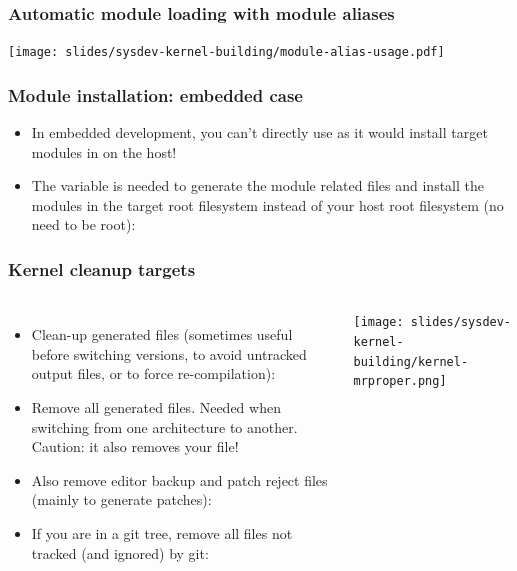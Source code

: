 \begin{frame}
  \frametitle{Automatic module loading with module aliases}
  \texttt{[image: slides/sysdev-kernel-building/module-alias-usage.pdf]}
\end{frame}

\begin{frame}
  \frametitle{Module installation: embedded case}
  \begin{itemize}
  \item In embedded development, you can't directly use
     as it would install target modules
    in  on the host!
  \item The  variable is needed to generate
    the module related files and install the modules in the target
    root filesystem instead of your host root filesystem (no need
    to be root):\\
  \end{itemize}
\end{frame}

\begin{frame}
  \frametitle{Kernel cleanup targets}
  \begin{columns}
    \small
    \begin{itemize}
    \item Clean-up generated files (sometimes useful before switching
          versions, to avoid untracked output files, or to force re-compilation):\\
    \item Remove all generated files. Needed when switching from one
      architecture to another. Caution: it also removes your  file!\\
    \item Also remove editor backup and patch reject files (mainly to
      generate patches):\\
    \item If you are in a git tree, remove all files not tracked (and
      ignored) by git:\\
    \end{itemize}
    \texttt{[image: slides/sysdev-kernel-building/kernel-mrproper.png]}
  \end{columns}
\end{frame}

